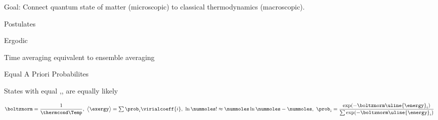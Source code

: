 \begin{bigmdframed}

    
\begin{listone}
    
    \item Goal: Connect quantum state of matter (microscopic) to classical thermodynamics (macroscopic).
    
    \item Postulates
    
    \begin{listtwo}
    
    	\item Ergodic
        
        \begin{listthree}
        
    		\item Time averaging equivalent to ensemble averaging

		\end{listthree}

    	\item Equal A Priori Probabilites
        
       	\begin{listthree}
        
    		\item States with equal \nummoles,\uline{\vol},\uline{\energy} are equally likely
    
    	\end{listthree}
    
    \end{listtwo}
    
    \item $\boltznorm = \dfrac{1}{\thermcond\Temp},~\big\langle\exergy\big\rangle = \sum\nolimits\prob_{i}\virialcoeff{i},~\ln\nummoles!\approx \nummoles\ln\nummoles - \nummoles,~\prob_{i} = \dfrac{\exp(-\boltznorm\uline{\energy}_{i})}{\sum\nolimits\exp(-\boltznorm\uline{\energy}_{i})}$
    
\end{listone}
     
\end{bigmdframed}